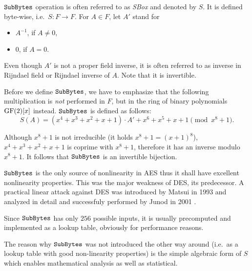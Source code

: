 	$\texttt{SubBytes}$ operation is often referred to as {\em SBox} and denoted by $S$. It is defined byte-wise, i.e.\ $S: F \rightarrow F$. For $A\in F$, let $A'$ stand for
	\begin{itemize}
		\item $A^{-1}$, if $A \neq 0$,
		\item $0$, if $A = 0$.
	\end{itemize}
	
	\begin{note}
	\label{note:rijinv}
		Even though $A'$ is not a proper field inverse, it is often referred to as inverse in Rijndael field or Rijndael inverse of $A$. Note that it is invertible.
	\end{note}
	
	Before we define $\texttt{SubBytes}$, we have to emphasize that the following multiplication is {\em not} performed in $F$, but in the ring of binary polynomials $\mathrm{GF}(2)[x]$ instead. $\texttt{SubBytes}$ is defined as follows:
	\newcommand{\defsbox}{S(A) = (x^4 + x^3 + x^2 + x + 1) \cdot A' + x^6 + x^5 + x + 1 \pmod{x^8+1}}
	\begin{equation}
	\label{eq:sbox}
		\defsbox .
	\end{equation}
	
	\begin{note}
	\label{note:sboxinv}
		Although $x^8+1$ is not irreducible (it holds $x^8+1 = (x+1)^8$), $x^4 + x^3 + x^2 + x + 1$ is coprime with $x^8+1$, therefore it has an inverse modulo $x^8+1$. It follows that $\texttt{SubBytes}$ is an invertible bijection.
	\end{note}
	
	$\texttt{SubBytes}$ is the only source of nonlinearity in AES thus it shall have excellent nonlinearity properties. This was the major weakness of DES, its predecessor. A practical linear attack against DES was introduced by Matsui in 1993 \cite{matsui1993linear} and analyzed in detail and successfuly performed by Junod in 2001 \cite{junod2001complexity}.
	
	\begin{note}
	\label{note:sboxtable}
		Since $\texttt{SubBytes}$ has only $256$ possible inputs, it is usually precomputed and implemented as a lookup table, obviously for performance reasons.
	\end{note}
	
	The reason why $\texttt{SubBytes}$ was not introduced the other way around (i.e.\ as a lookup table with good non-linearity properties) is the simple algebraic form of $S$ which enables mathematical analysis as well as statistical.   %

